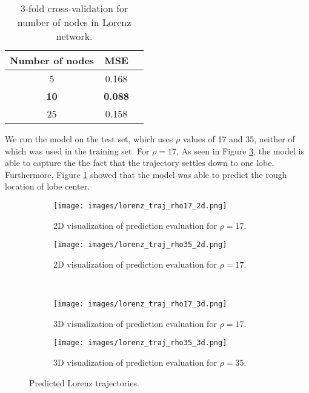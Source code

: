 \documentclass[letterpaper, 10 pt, conference]{ieeeconf}  %
\begin{document}
\begin{table}[ht]
\caption{3-fold cross-validation for number of nodes in Lorenz network.} %
\centering %
\begin{tabular}{c c c} 
\hline\hline 
Number of nodes & MSE \\
\hline
5 & 0.168 \\
\textbf{10} & \textbf{0.088} \\
25 & 0.158 \\
\end{tabular}
\label{table:ks_lorenz} %
\end{table}

We run the model on the test set, which uses $\rho$ values of 17 and 35, neither of which was used in the training set. For $\rho = 17$, As seen in Figure \ref{fig:lorenz_test_pred_17_3d}, the model is able to capture the the fact that the trajectory settles down to one lobe. Furthermore, Figure  \ref{fig:lorenz_test_pred_17_2d} showed that the model was able to predict the rough location of lobe center.

\begin{figure*}[htb]
\centering
\begin{subfigure}{0.49\textwidth}
  \centering
    \texttt{[image: images/lorenz\_traj\_rho17\_2d.png]}
    \caption{2D visualization of prediction evaluation for $\rho = 17$.}
    \label{fig:lorenz_test_pred_17_2d}
\end{subfigure}
\begin{subfigure}{0.49\textwidth}
  \centering
    \texttt{[image: images/lorenz\_traj\_rho35\_2d.png]}
    \caption{2D visualization of prediction evaluation for $\rho = 17$.}
    \label{fig:lorenz_test_pred_35_2d}
\end{subfigure}\\
\begin{subfigure}{0.49\textwidth}
  \centering
    \texttt{[image: images/lorenz\_traj\_rho17\_3d.png]}
    \caption{3D visualization of prediction evaluation for $\rho = 17$.}
    \label{fig:lorenz_test_pred_17_3d}
\end{subfigure} 
\begin{subfigure}{0.49\textwidth}
  \centering
    \texttt{[image: images/lorenz\_traj\_rho35\_3d.png]}
    \caption{3D visualization of prediction evaluation for $\rho = 35$.}
    \label{fig:lorenz_test_pred_35_3d}
\end{subfigure}
\caption{Predicted Lorenz trajectories.}
\end{figure*}
\end{document}
